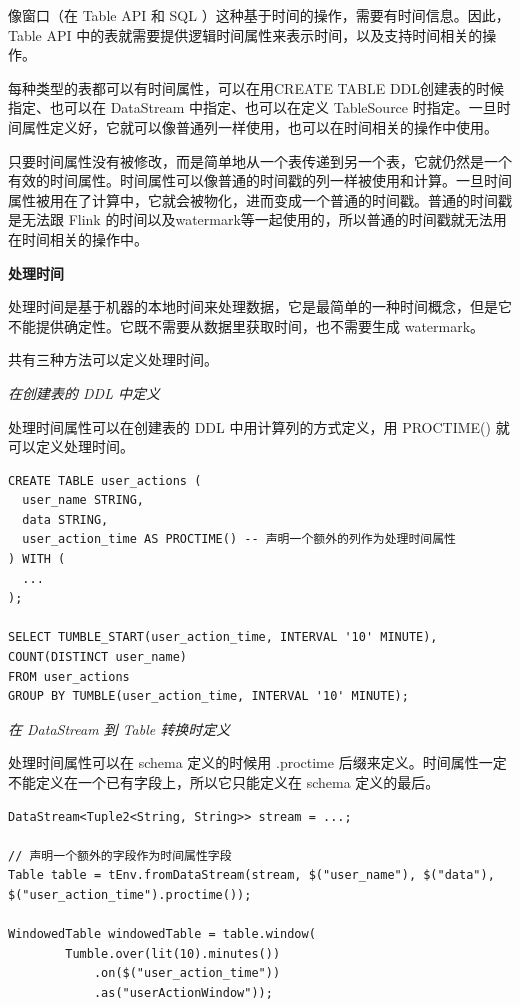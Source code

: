 \documentclass[cn,11pt,chinese]{elegantbook}
\begin{document}
像窗口（在 Table API 和 SQL ）这种基于时间的操作，需要有时间信息。因此，Table API 中的表就需要提供逻辑时间属性来表示时间，以及支持时间相关的操作。

每种类型的表都可以有时间属性，可以在用CREATE TABLE DDL创建表的时候指定、也可以在 DataStream 中指定、也可以在定义 TableSource 时指定。一旦时间属性定义好，它就可以像普通列一样使用，也可以在时间相关的操作中使用。

只要时间属性没有被修改，而是简单地从一个表传递到另一个表，它就仍然是一个有效的时间属性。时间属性可以像普通的时间戳的列一样被使用和计算。一旦时间属性被用在了计算中，它就会被物化，进而变成一个普通的时间戳。普通的时间戳是无法跟 Flink 的时间以及watermark等一起使用的，所以普通的时间戳就无法用在时间相关的操作中。

\textbf{处理时间}

处理时间是基于机器的本地时间来处理数据，它是最简单的一种时间概念，但是它不能提供确定性。它既不需要从数据里获取时间，也不需要生成 watermark。

共有三种方法可以定义处理时间。

\textit{在创建表的 DDL 中定义}

处理时间属性可以在创建表的 DDL 中用计算列的方式定义，用 PROCTIME() 就可以定义处理时间。

\begin{verbatim}
CREATE TABLE user_actions (
  user_name STRING,
  data STRING,
  user_action_time AS PROCTIME() -- 声明一个额外的列作为处理时间属性
) WITH (
  ...
);

SELECT TUMBLE_START(user_action_time, INTERVAL '10' MINUTE), COUNT(DISTINCT user_name)
FROM user_actions
GROUP BY TUMBLE(user_action_time, INTERVAL '10' MINUTE);
\end{verbatim}

\textit{在 DataStream 到 Table 转换时定义}

处理时间属性可以在 schema 定义的时候用 .proctime 后缀来定义。时间属性一定不能定义在一个已有字段上，所以它只能定义在 schema 定义的最后。

\begin{verbatim}
DataStream<Tuple2<String, String>> stream = ...;

// 声明一个额外的字段作为时间属性字段
Table table = tEnv.fromDataStream(stream, $("user_name"), $("data"), $("user_action_time").proctime());

WindowedTable windowedTable = table.window(
        Tumble.over(lit(10).minutes())
            .on($("user_action_time"))
            .as("userActionWindow"));
\end{verbatim}
\end{document}
